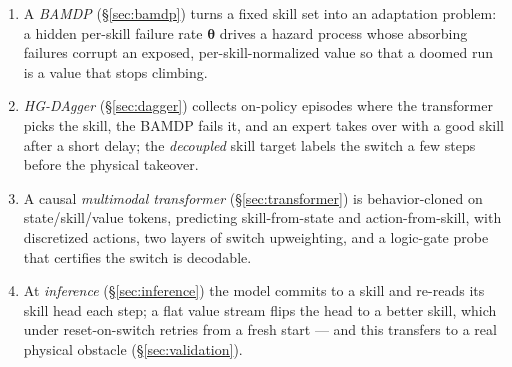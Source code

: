 \documentclass[11pt]{article}
\newcommand{\theem}{\bm{\theta}}
\begin{document}
\begin{enumerate}
\item A \emph{BAMDP} (\S\ref{sec:bamdp}) turns a fixed skill set into an adaptation
problem: a hidden per-skill failure rate $\theem$ drives a hazard process whose
absorbing failures corrupt an exposed, per-skill-normalized value so that a doomed run
is a value that stops climbing.
\item \emph{HG-DAgger} (\S\ref{sec:dagger}) collects on-policy episodes where the
transformer picks the skill, the BAMDP fails it, and an expert takes over with a good
skill after a short delay; the \emph{decoupled} skill target labels the switch a few
steps before the physical takeover.
\item A causal \emph{multimodal transformer} (\S\ref{sec:transformer}) is behavior-cloned
on state/skill/value tokens, predicting skill-from-state and action-from-skill, with
discretized actions, two layers of switch upweighting, and a logic-gate probe that
certifies the switch is decodable.
\item At \emph{inference} (\S\ref{sec:inference}) the model commits to a skill and
re-reads its skill head each step; a flat value stream flips the head to a better
skill, which under reset-on-switch retries from a fresh start --- and this transfers to
a real physical obstacle (\S\ref{sec:validation}).
\end{enumerate}
\end{document}
